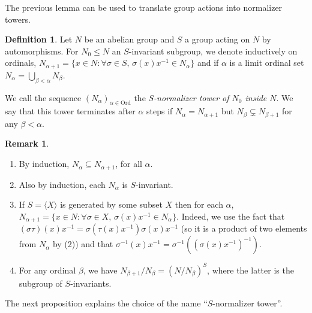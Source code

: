 \documentclass[11pt]{amsart}
\theoremstyle{plain}
\theoremstyle{definition}
\newtheorem{definition}[theorem]{Definition}
\newtheorem{remark}[theorem]{Remark}
\newcounter{step}
\begin{document}
The previous lemma can be used to translate group actions into normalizer towers. 

\begin{definition}\label{D:tower}
    Let $N$ be an abelian group and $S$ a group acting on $N$ by automorphisms. For $N_0\leq N$ an $S$-invariant subgroup, we denote inductively on ordinals, $N_{\alpha+1}=\{x\in N:\forall \sigma\in S,\,\sigma(x)x^{-1}\in N_\alpha\}$ and if $\alpha$ is a limit ordinal set $N_\alpha=\bigcup_{\beta<\alpha} N_\beta$. 

    We call the sequence $(N_\alpha)_{\alpha\in \mathrm{Ord}}$ the \emph{$S$-normalizer tower of $N_0$ inside $N$}. We say that this tower terminates after $\alpha$ steps if $N_{\alpha}=N_{\alpha+1}$ but $N_\beta\subsetneq N_{\beta+1}$ for any $\beta<\alpha$.
\end{definition}



\begin{remark}\label{R: remarks on invariants tower}
    \begin{enumerate}
        \item By induction, $N_{\alpha}\subseteq N_{\alpha+1}$, for all $\alpha$.
        \item Also by induction, each $N_\alpha$ is $S$-invariant.

        \item If $S=\langle X\rangle$ is generated by some subset $X$ then for each $\alpha$, $N_{\alpha+1}=\{x\in N:\forall \sigma\in X,\,\sigma(x)x^{-1}\in N_\alpha\}.$ Indeed, we use the fact that $(\sigma\tau)(x)x^{-1}=\sigma(\tau(x)x^{-1})\sigma(x)x^{-1}$ (so it is a product of two elements from $N_\alpha$ by (2)) and that $\sigma^{-1}(x)x^{-1}=\sigma^{-1}((\sigma(x)x^{-1})^{-1})$.
        \item For any ordinal $\beta$, we have  $N_{\beta+1}/N_\beta=(N/N_\beta)^S$, where the latter is the subgroup of $S$-invariants. 
    \end{enumerate}
\end{remark}


The next proposition explains the choice of the name ``$S$-normalizer tower''.
\end{document}
